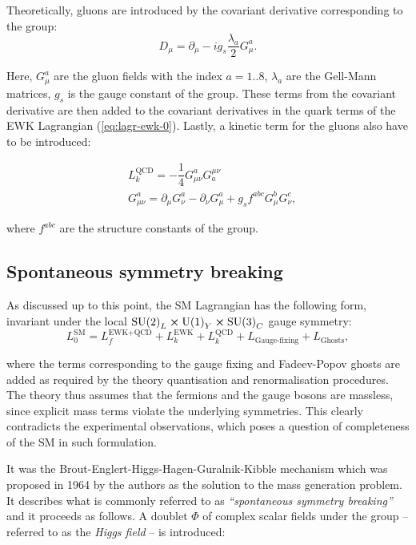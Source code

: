 Theoretically, gluons are introduced by the covariant derivative corresponding to the \suthr group:
\begin{equation}
    D_\mu = \partial_\mu - ig_s\dfrac{\lambda_a}{2}G_\mu^a.
\end{equation}

Here, $G_\mu^a$ are the gluon fields with the index $a=1..8$, $\lambda_a$ are the Gell-Mann matrices, $g_s$ is the gauge constant of the \suthr group. These terms from the covariant derivative are then added to the covariant derivatives in the quark terms of the EWK Lagrangian (\ref{eq:lagr-ewk-0}). Lastly, a kinetic term for the gluons also have to be introduced:

\begin{align}
    &L_k^\text{QCD} = -\dfrac{1}{4}G_{\mu\nu}^aG^{\mu\nu}_a\\
    &G_{\mu\nu}^a = \partial_\mu G_\nu^a - \partial_\nu G_\mu^a + g_s f^{abc}G_\mu^b G_\nu^c,
\end{align}

where $f^{abc}$ are the structure constants of the \suthr group.

\subsection{Spontaneous symmetry breaking}\label{sec:break}

As discussed up to this point, the SM Lagrangian has the following form, invariant under the local $\text{SU(2)}_L \cross \text{U(1)}_Y \cross \text{SU(3)}_C$ gauge symmetry:
\begin{equation}
    L_0^\text{SM} = L_f^\text{EWK+QCD} + L_k^\text{EWK} + L_k^\text{QCD} + L_\text{Gauge-fixing} + L_\text{Ghosts},
\end{equation}

where the terms corresponding to the gauge fixing and Fadeev-Popov ghosts are added as required by the theory quantisation and renormalisation procedures. The theory thus assumes that the fermions and the gauge bosons are massless, since explicit mass terms violate the underlying symmetries. This clearly contradicts the experimental observations, which poses a question of completeness of the SM in such formulation.

It was the Brout-Englert-Higgs-Hagen-Guralnik-Kibble
mechanism \cite{Englert:1964et,Higgs:1964ia,Higgs:1964pj,Guralnik:1964eu} which was proposed in 1964 by the authors as the solution to the mass generation problem. It describes what is commonly referred to as \textit{\enquote{spontaneous symmetry breaking}} and it proceeds as follows. A doublet $\Phi$ of complex scalar fields under the \sutwo group -- referred to as the \textit{Higgs field} -- is introduced:

